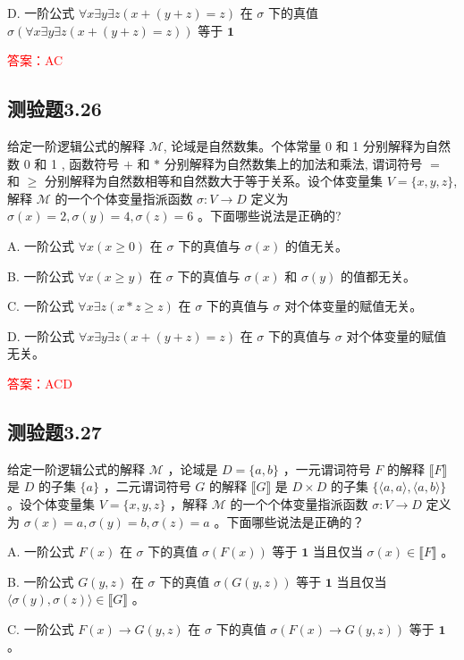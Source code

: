 \documentclass[UTF8, heading=true]{ctexart}
\begin{document}
D. 一阶公式 $\forall x \exists y \exists z(x+(y+z)=z)$ 在 $\sigma$ 下的真值 $\sigma(\forall x \exists y \exists z(x+(y+z)=z))$ 等于 $\mathbf{1}$

\textcolor{red}{答案：AC}

\subsection{测验题3.26}

给定一阶逻辑公式的解释 $\mathcal{M}$, 论域是自然数集。个体常量 0 和 1 分别解释为自然数 0 和 1 , 函数符号 $+$ 和 $*$ 分别解释为自然数集上的加法和乘法, 谓词符号 $=$ 和 $\geq$ 分别解释为自然数相等和自然数大于等于关系。设个体变量集 $V=\{x, y, z\}$, 解释 $\mathcal{M}$ 的一个个体变量指派函数 $\sigma: V \rightarrow D$ 定义为 $\sigma(x)=2, \sigma(y)=4, \sigma(z)=6$ 。下面哪些说法是正确的?

A. 一阶公式 $\forall x(x \geq 0)$ 在 $\sigma$ 下的真值与 $\sigma(x)$ 的值无关。

B. 一阶公式 $\forall x(x \geq y)$ 在 $\sigma$ 下的真值与 $\sigma(x)$ 和 $\sigma(y)$ 的值都无关。

C. 一阶公式 $\forall x \exists z(x * z \geq z)$ 在 $\sigma$ 下的真值与 $\sigma$ 对个体变量的赋值无关。

D. 一阶公式 $\forall x \exists y \exists z(x+(y+z)=z)$ 在 $\sigma$ 下的真值与 $\sigma$ 对个体变量的赋值无关。

\textcolor{red}{答案：ACD}

\subsection{测验题3.27}

给定一阶逻辑公式的解释 $\mathcal{M}$ ，论域是 $D=\{a, b\}$ ，一元谓词符号 $F$ 的解释 $\llbracket F\rrbracket$ 是 $D$ 的子集 $\{a\}$ ，二元谓词符号 $G$ 的解释 $\llbracket G \rrbracket$ 是 $D \times D$ 的子集 $\{\langle a, a\rangle,\langle a, b\rangle\}$ 。设个体变量集 $V=\{x, y, z\}$ ，解释 $\mathcal{M}$ 的一个个体变量指派函数 $\sigma: V \rightarrow D$ 定义为 $\sigma(x)=a, \sigma(y)=b, \sigma(z)=a$ 。下面哪些说法是正确的？

A. 一阶公式 $F(x)$ 在 $\sigma$ 下的真值 $\sigma(F(x))$ 等于 $\mathbf{1}$ 当且仅当 $\sigma(x) \in \llbracket F \rrbracket$ 。

B. 一阶公式 $G(y, z)$ 在 $\sigma$ 下的真值 $\sigma(G(y, z))$ 等于 $\mathbf{1}$ 当且仅当 $\langle\sigma(y), \sigma(z)\rangle \in \llbracket G \rrbracket$ 。

C. 一阶公式 $F(x) \rightarrow G(y, z)$ 在 $\sigma$ 下的真值 $\sigma(F(x) \rightarrow G(y, z))$ 等于 $\mathbf{1}$ 。
\end{document}
